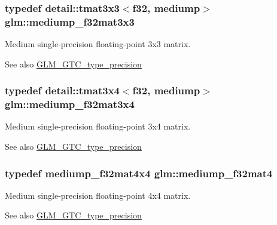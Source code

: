 \subsubsection[{\texorpdfstring{mediump\+\_\+f32mat3x3}{mediump_f32mat3x3}}]{\setlength{\rightskip}{0pt plus 5cm}typedef detail\+::tmat3x3$<$f32, mediump$>$ {\bf glm\+::mediump\+\_\+f32mat3x3}}\hypertarget{group__gtc__type__precision_gad4d01189a1462366b143c5cbc3de0ea9}{}\label{group__gtc__type__precision_gad4d01189a1462366b143c5cbc3de0ea9}
Medium single-\/precision floating-\/point 3x3 matrix. \begin{DoxySeeAlso}{See also}
\hyperlink{group__gtc__type__precision}{G\+L\+M\+\_\+\+G\+T\+C\+\_\+type\+\_\+precision} 
\end{DoxySeeAlso}
\subsubsection[{\texorpdfstring{mediump\+\_\+f32mat3x4}{mediump_f32mat3x4}}]{\setlength{\rightskip}{0pt plus 5cm}typedef detail\+::tmat3x4$<$f32, mediump$>$ {\bf glm\+::mediump\+\_\+f32mat3x4}}\hypertarget{group__gtc__type__precision_ga7ad59b967576d930f4c8aa7b8c48e1af}{}\label{group__gtc__type__precision_ga7ad59b967576d930f4c8aa7b8c48e1af}
Medium single-\/precision floating-\/point 3x4 matrix. \begin{DoxySeeAlso}{See also}
\hyperlink{group__gtc__type__precision}{G\+L\+M\+\_\+\+G\+T\+C\+\_\+type\+\_\+precision} 
\end{DoxySeeAlso}
\subsubsection[{\texorpdfstring{mediump\+\_\+f32mat4}{mediump_f32mat4}}]{\setlength{\rightskip}{0pt plus 5cm}typedef mediump\+\_\+f32mat4x4 {\bf glm\+::mediump\+\_\+f32mat4}}\hypertarget{group__gtc__type__precision_ga56bd98ec31b6abc0315d688d4ecd94a0}{}\label{group__gtc__type__precision_ga56bd98ec31b6abc0315d688d4ecd94a0}
Medium single-\/precision floating-\/point 4x4 matrix. \begin{DoxySeeAlso}{See also}
\hyperlink{group__gtc__type__precision}{G\+L\+M\+\_\+\+G\+T\+C\+\_\+type\+\_\+precision} 
\end{DoxySeeAlso}
